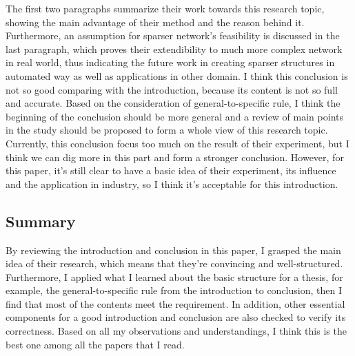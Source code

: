 \documentclass{article}
\begin{document}
{\large

The first two paragraphs summarize their work towards this research topic, showing the main advantage of their method and the reason behind it. Furthermore, an assumption for sparser network's feasibility is discussed in the last paragraph, which proves their extendibility to much more complex network in real world, thus indicating the future work in creating sparser structures in automated way as well as applications in other domain. I think this conclusion is not so good comparing with the introduction, because its content is not so full and accurate. Based on the consideration of general-to-specific rule, I think the beginning of the conclusion should be more general and a review of main points in the study should be proposed to form a whole view of this research topic. Currently, this conclusion focus too much on the result of their experiment, but I think we can dig more in this part and form a stronger conclusion. However, for this paper, it's still clear to have a basic idea of their experiment, its influence and the application in industry, so I think it's acceptable for this introduction.

}


\subsection{Summary}

{\large

By reviewing the introduction and conclusion in this paper, I grasped the main idea of their research, which means that they're convincing and well-structured. Furthermore, I applied what I learned about the basic structure for a thesis, for example, the general-to-specific rule from the introduction to conclusion, then I find that most of the contents meet the requirement. In addition, other essential components for a good introduction and conclusion are also checked to verify its correctness. Based on all my observations and understandings, I think this is the best one among all the papers that I read.

}
\end{document}
